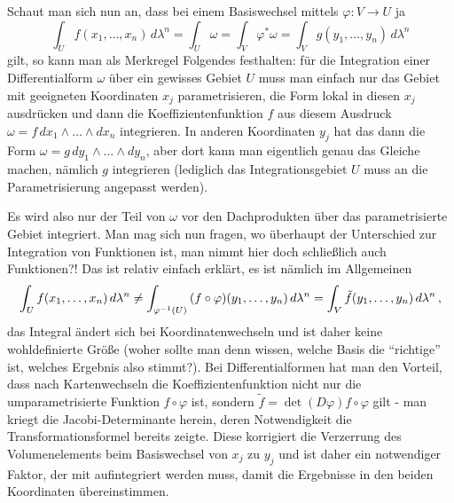 \documentclass[../H_Analysis_main.tex]{subfiles}
\begin{document}
Schaut man sich nun an, dass bei einem Basiswechsel mittels $\varphi: V \rightarrow U$ ja
\begin{equation*}
\int_U f(x_1, \dots, x_n) \, d\lambda^n = \int_U \omega = \int_V \varphi^* \omega = \int_V g(y_1, \dots, y_n) \, d\lambda^n
\end{equation*}
gilt, so kann man als Merkregel Folgendes festhalten: für die Integration einer Differentialform $\omega$ über ein gewisses Gebiet $U$ muss man einfach nur das Gebiet mit geeigneten Koordinaten $x_j$ parametrisieren, die Form lokal in diesen $x_j$ ausdrücken und dann die Koeffizientenfunktion $f$ aus diesem Ausdruck $\omega = f \, dx_1 \wedge \dots \wedge dx_n$ integrieren. In anderen Koordinaten $y_j$ hat das dann die Form $\omega = g \, dy_1 \wedge \dots \wedge dy_n$, aber dort kann man eigentlich genau das Gleiche machen, nämlich $g$ integrieren (lediglich das Integrationsgebiet $U$ muss an die Parametrisierung angepasst werden).

Es wird also nur der Teil von $\omega$ vor den Dachprodukten über das parametrisierte Gebiet integriert. Man mag sich nun fragen, wo überhaupt der Unterschied zur Integration von Funktionen ist, man nimmt hier doch schließlich auch Funktionen?! Das ist relativ einfach erklärt, es ist nämlich im Allgemeinen
\begin{equation}
\int_U f(x_1, \dots, x_n) \, d\lambda^n \neq \int_{\varphi^{-1}(U)} \qty(f \circ \varphi)(y_1, \dots, y_n) \, d\lambda^n = \int_V \tilde{f}(y_1, \dots, y_n) \, d\lambda^n \, ,
\end{equation}
das Integral ändert sich bei Koordinatenwechseln und ist daher keine wohldefinierte Größe (woher sollte man denn wissen, welche Basis die \enquote{richtige} ist, welches Ergebnis also stimmt?). Bei Differentialformen hat man den Vorteil, dass nach Kartenwechseln die Koeffizientenfunktion nicht nur die umparametrisierte Funktion $f \circ \varphi$ ist, sondern $\tilde{f} = \det(D\varphi) f \circ \varphi$ gilt - man kriegt die Jacobi-Determinante herein, deren Notwendigkeit die Transformationsformel bereits zeigte. Diese korrigiert die Verzerrung des Volumenelements beim Basiswechsel von $x_j$ zu $y_j$ und ist daher ein notwendiger Faktor, der mit aufintegriert werden muss, damit die Ergebnisse in den beiden Koordinaten übereinstimmen.

\end{document}
